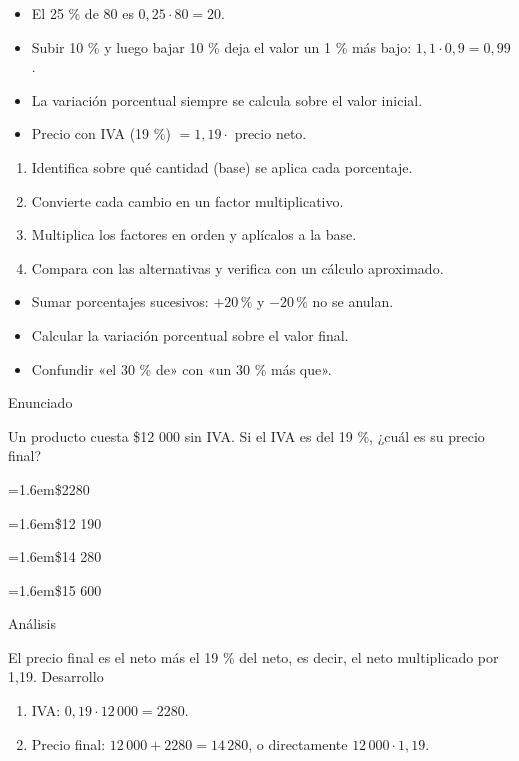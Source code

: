 \documentclass[10pt,a4paper,twocolumn]{article}
\newcommand{\alternativa}[2]{\par\noindent\hangindent=1.6em\hangafter=1\makebox[1.6em][l]{\tecla{#1}}#2\par}
\newcommand{\clave}[1]{\par\smallskip{\sffamily\footnotesize\color{esmeralda} Clave \teclaok{#1}}\par}
\begin{document}
\begin{ideasclave}
\begin{itemize}
  \item El 25 \% de 80 es $0{,}25\cdot 80=20$.
  \item Subir 10 \% y luego bajar 10 \% deja el valor un 1 \% más bajo: $1{,}1\cdot 0{,}9=0{,}99$.
  \item La variación porcentual siempre se calcula sobre el valor inicial.
  \item Precio con IVA (19 \%) $=1{,}19\cdot$ precio neto.
\end{itemize}
\end{ideasclave}

\begin{metodo}
\begin{enumerate}
  \item Identifica sobre qué cantidad (base) se aplica cada porcentaje.
  \item Convierte cada cambio en un factor multiplicativo.
  \item Multiplica los factores en orden y aplícalos a la base.
  \item Compara con las alternativas y verifica con un cálculo aproximado.
\end{enumerate}
\end{metodo}

\begin{errorfrecuente}
\begin{itemize}
  \item Sumar porcentajes sucesivos: $+20\,\%$ y $-20\,\%$ no se anulan.
  \item Calcular la variación porcentual sobre el valor final.
  \item Confundir «el 30 \% de» con «un 30 \% más que».
\end{itemize}
\end{errorfrecuente}

\begin{ejemplo}
{\sffamily\footnotesize\color{zinc500} Enunciado}\par
Un producto cuesta \$12 000 sin IVA. Si el IVA es del 19 \%, ¿cuál es su precio final?
\alternativa{A}{\$2280}
\alternativa{B}{\$12 190}
\alternativa{C}{\$14 280}
\alternativa{D}{\$15 600}
\clave{C}
{\sffamily\footnotesize\color{zinc500} Análisis}\par El precio final es el neto más el 19 \% del neto, es decir, el neto multiplicado por 1,19.
{\sffamily\footnotesize\color{zinc500} Desarrollo}
\begin{enumerate}
  \item IVA: $0{,}19\cdot 12\,000=2280$.
  \item Precio final: $12\,000+2280=14\,280$, o directamente $12\,000\cdot 1{,}19$.
\end{enumerate}
\end{ejemplo}
\end{document}
